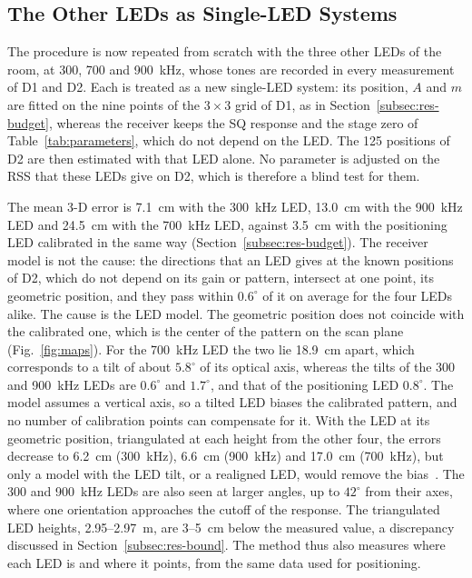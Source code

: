 \subsection{The Other LEDs as Single-LED Systems}
\label{subsec:res-leds}
The procedure is now repeated from scratch with the three other LEDs of the room, at 300, 700 and 900~kHz, whose tones are recorded in every measurement of D1 and D2. Each is treated as a new single-LED system: its position, $A$ and $m$ are fitted on the nine points of the $3\times3$ grid of D1, as in Section~\ref{subsec:res-budget}, whereas the receiver keeps the SQ response and the stage zero of Table~\ref{tab:parameters}, which do not depend on the LED. The 125 positions of D2 are then estimated with that LED alone. No parameter is adjusted on the RSS that these LEDs give on D2, which is therefore a blind test for them.

The mean \mbox{3-D} error is 7.1~cm with the 300~kHz LED, 13.0~cm with the 900~kHz LED and 24.5~cm with the 700~kHz LED, against 3.5~cm with the positioning LED calibrated in the same way (Section~\ref{subsec:res-budget}). The receiver model is not the cause: the directions that an LED gives at the known positions of D2, which do not depend on its gain or pattern, intersect at one point, its geometric position, and they pass within $0.6^\circ$ of it on average for the four LEDs alike. The cause is the LED model. The geometric position does not coincide with the calibrated one, which is the center of the pattern on the scan plane (Fig.~\ref{fig:maps}). For the 700~kHz LED the two lie 18.9~cm apart, which corresponds to a tilt of about $5.8^\circ$ of its optical axis, whereas the tilts of the 300 and 900~kHz LEDs are $0.6^\circ$ and $1.7^\circ$, and that of the positioning LED $0.8^\circ$. The model assumes a vertical axis, so a tilted LED biases the calibrated pattern, and no number of calibration points can compensate for it. With the LED at its geometric position, triangulated at each height from the other four, the errors decrease to 6.2~cm (300~kHz), 6.6~cm (900~kHz) and 17.0~cm (700~kHz), but only a model with the LED tilt, or a realigned LED, would remove the bias~\cite{Bastiaens2026}. The 300 and 900~kHz LEDs are also seen at larger angles, up to $42^\circ$ from their axes, where one orientation approaches the cutoff of the response. The triangulated LED heights, 2.95--2.97~m, are 3--5~cm below the measured value, a discrepancy discussed in Section~\ref{subsec:res-bound}. The method thus also measures where each LED is and where it points, from the same data used for positioning.

